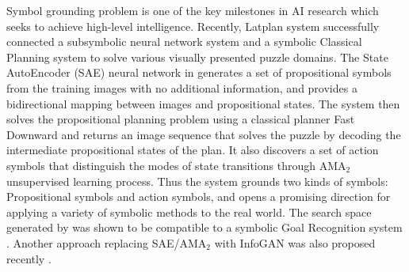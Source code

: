 Symbol grounding problem \cite{harnad1990symbol,Steels2008} is one of the key milestones in AI research
which seeks to achieve high-level intelligence.
% 
% 
Recently, Latplan system \cite[]{Asai2018} successfully
connected a subsymbolic neural network system and a symbolic Classical Planning system
to solve various visually presented puzzle domains.
The State AutoEncoder (SAE) neural network in \latentplanner
generates a set of propositional symbols from the training images with no additional information,
and provides a bidirectional mapping between images and propositional states.
% 
The system then solves the propositional planning problem using a classical planner Fast Downward \cite{Helmert04}
and returns an image sequence that solves the puzzle
by decoding the intermediate propositional states of the plan.
It also discovers a set of action symbols that distinguish the modes of
state transitions through AMA$_2$ unsupervised learning process.
Thus the system grounds two kinds of symbols:
Propositional symbols and action symbols,
% 
and opens a promising direction for applying a variety of symbolic methods to the real world.
The search space generated by \latentplanner was shown to be compatible
to a symbolic Goal Recognition system \cite{amado2018goal}.
Another approach replacing SAE/AMA$_2$ with InfoGAN was also proposed recently \cite{kurutach2018learning}.

